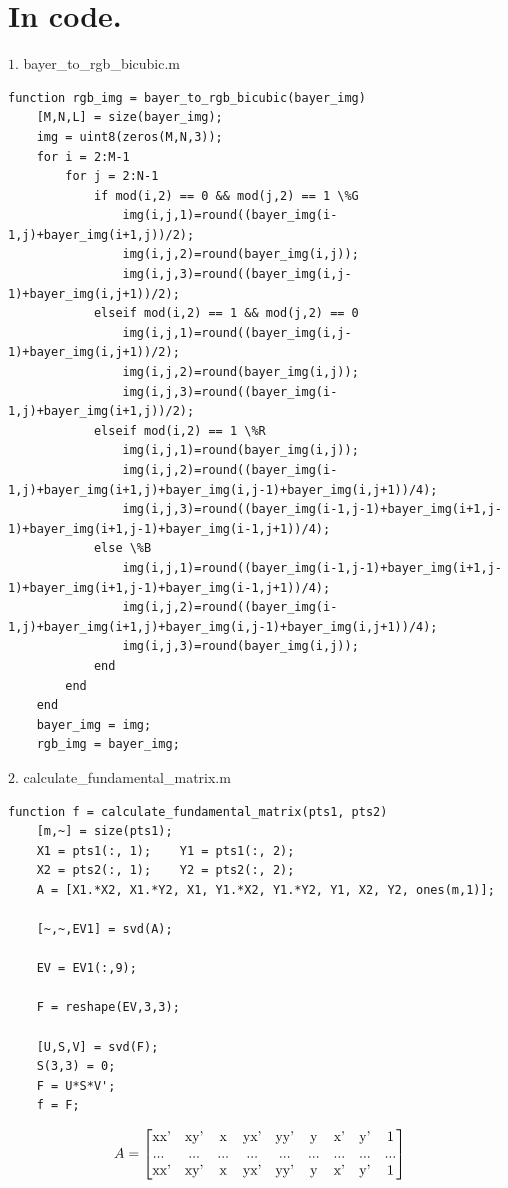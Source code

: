 \section*{In code.}
{\large $1.$ bayer\_to\_rgb\_bicubic.m \par}
\begin{lstlisting}[style=Matlab-editor]
function rgb_img = bayer_to_rgb_bicubic(bayer_img)
    [M,N,L] = size(bayer_img);
    img = uint8(zeros(M,N,3));
    for i = 2:M-1
        for j = 2:N-1
            if mod(i,2) == 0 && mod(j,2) == 1 \%G
                img(i,j,1)=round((bayer_img(i-1,j)+bayer_img(i+1,j))/2);
                img(i,j,2)=round(bayer_img(i,j));
                img(i,j,3)=round((bayer_img(i,j-1)+bayer_img(i,j+1))/2);
            elseif mod(i,2) == 1 && mod(j,2) == 0
                img(i,j,1)=round((bayer_img(i,j-1)+bayer_img(i,j+1))/2);
                img(i,j,2)=round(bayer_img(i,j));
                img(i,j,3)=round((bayer_img(i-1,j)+bayer_img(i+1,j))/2);
            elseif mod(i,2) == 1 \%R
                img(i,j,1)=round(bayer_img(i,j));
                img(i,j,2)=round((bayer_img(i-1,j)+bayer_img(i+1,j)+bayer_img(i,j-1)+bayer_img(i,j+1))/4);
                img(i,j,3)=round((bayer_img(i-1,j-1)+bayer_img(i+1,j-1)+bayer_img(i+1,j-1)+bayer_img(i-1,j+1))/4);
            else \%B
                img(i,j,1)=round((bayer_img(i-1,j-1)+bayer_img(i+1,j-1)+bayer_img(i+1,j-1)+bayer_img(i-1,j+1))/4);
                img(i,j,2)=round((bayer_img(i-1,j)+bayer_img(i+1,j)+bayer_img(i,j-1)+bayer_img(i,j+1))/4);
                img(i,j,3)=round(bayer_img(i,j));
            end
        end
    end
    bayer_img = img;
    rgb_img = bayer_img;
\end{lstlisting}


{\large $2.$ calculate\_fundamental\_matrix.m \par}
\begin{lstlisting}[style=Matlab-editor]
function f = calculate_fundamental_matrix(pts1, pts2)
    [m,~] = size(pts1);
    X1 = pts1(:, 1);    Y1 = pts1(:, 2);
    X2 = pts2(:, 1);    Y2 = pts2(:, 2);
    A = [X1.*X2, X1.*Y2, X1, Y1.*X2, Y1.*Y2, Y1, X2, Y2, ones(m,1)];

    [~,~,EV1] = svd(A);

    EV = EV1(:,9);

    F = reshape(EV,3,3);

    [U,S,V] = svd(F);
    S(3,3) = 0;
    F = U*S*V';
    f = F;
\end{lstlisting}
\[
A=
  \begin{bmatrix}
    $xx'$ & $xy'$ & $x$ & $yx'$ & $yy'$ & $y$ & $x'$ & $y'$ & 1 \\
    $... $ & $...$ & $...$ & $...$ & $...$ & $...$ & $...$ & $...$ & $...$ \\
    $xx'$ & $xy'$ & $x$ & $yx'$ & $yy'$ & $y$ & $x'$ & $y'$ & 1 
  \end{bmatrix}
\]\\\\

